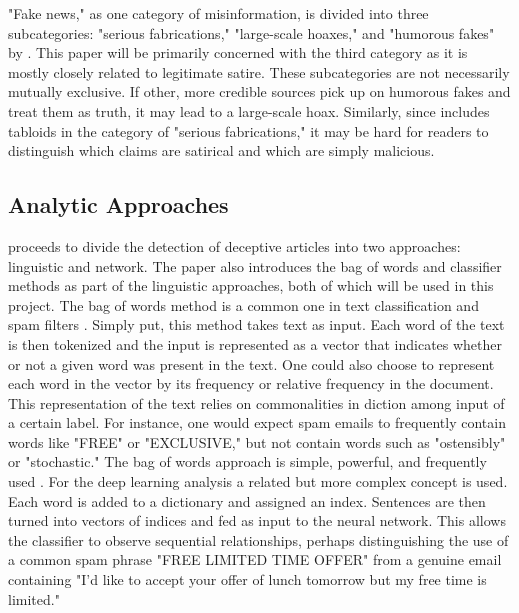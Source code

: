 \documentclass [12 pt] {report}
\begin{document}
"Fake news," as one category of misinformation, is divided into three subcategories: "serious fabrications," "large-scale hoaxes," and "humorous fakes" by \cite{threeTypes}. This paper will be primarily concerned with the third category as it is mostly closely related to legitimate satire. These subcategories are not necessarily mutually exclusive. If other, more credible sources pick up on humorous fakes and treat them as truth, it may lead to a large-scale hoax. Similarly, since \cite{threeTypes} includes tabloids in the category of "serious fabrications," it may be hard for readers to distinguish which claims are satirical and which are simply malicious.
	
\subsection{Analytic Approaches}
\cite{Methods} proceeds to divide the detection of deceptive articles into two approaches: linguistic and network. The paper also introduces the bag of words and classifier methods as part of the linguistic approaches, both of which will be used in this project. The bag of words method is a common one in text classification \cite{Sebastiani} and spam filters \cite{Zhang}. Simply put, this method takes text as input. Each word of the text is then tokenized and the input is represented as a vector that indicates whether or not a given word was present in the text. One could also choose to represent each word in the vector by its frequency or relative frequency in the document. This representation of the text relies on commonalities in diction among input of a certain label. For instance, one would expect spam emails to frequently contain words like "FREE" or "EXCLUSIVE," but not contain words such as "ostensibly" or "stochastic." The bag of words approach is simple, powerful, and frequently used \cite{Ahmad} \cite{Burfoot} \cite{Mining}. For the deep learning analysis a related but more complex concept is used. Each word is added to a dictionary and assigned an index. Sentences are then turned into vectors of indices and fed as input to the neural network. This allows the classifier to observe sequential relationships, perhaps distinguishing the use of a common spam phrase "FREE LIMITED TIME OFFER" from a genuine email containing "I'd like to accept your offer of lunch tomorrow but my free time is limited."
\end{document}
